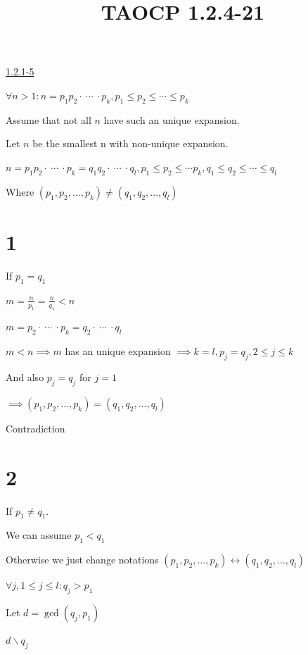 \documentclass{article}
\title{TAOCP 1.2.4\mbox{-}21}
\begin{document}
\maketitle

\href{../1.2.1. Mathematical induction/1.2.1-5.pdf}{1.2.1\mbox{-}5}

\( \forall n > 1: n = p_{1}p_{2} \cdot\ \cdots\ \cdot p_{k}, p_{1} \leq p_{2} \leq \cdots \leq p_{k} \)

Assume that not all \( n \) have such an unique expansion.

Let \( n \) be the smallest n with non-unique expansion.

\( n = p_{1}p_{2} \cdot\ \cdots\ \cdot p_{k} = q_{1}q_{2} \cdot\ \cdots\ \cdot q_{l}, p_{1} \leq p_{2} \leq \cdots p_{k}, q_{1} \leq q_{2} \leq \cdots \leq q_{l} \)

Where \( (p_{1},p_{2},\ldots,p_{k}) \neq (q_{1},q_{2},\ldots,q_{l}) \)

\section*{1}

If \( p_{1} = q_{1} \)

\( m = \frac{n}{p_{1}} = \frac{n}{q_{1}} < n \)

\( m = p_{2} \cdot\ \cdots\ \cdot p_{k} = q_{2} \cdot\ \cdots\ \cdot q_{l} \)

\( m < n \implies m \) has an unique expansion \( \implies k = l, p_{j} = q_{j}, 2 \leq j \leq k \)

And also \( p_{j} = q_{j} \) for \( j = 1 \)

\( \implies (p_{1},p_{2},\ldots,p_{k}) = (q_{1},q_{2},\ldots,q_{l}) \)

Contradiction

\section*{2}

If \( p_{1} \neq q_{1} \).

We can assume \( p_{1} < q_{1} \)

Otherwise we just change notations \( (p_{1}, p_{2}, \ldots, p_{k}) \leftrightarrow (q_{1}, q_{2}, \ldots, q_{l}) \)

\( \forall j, 1 \leq j \leq l: q_{j} > p_{1} \)

Let \( d = \gcd(q_{j}, p_{1}) \)

\( d \backslash  q_{j} \)
\end{document}
